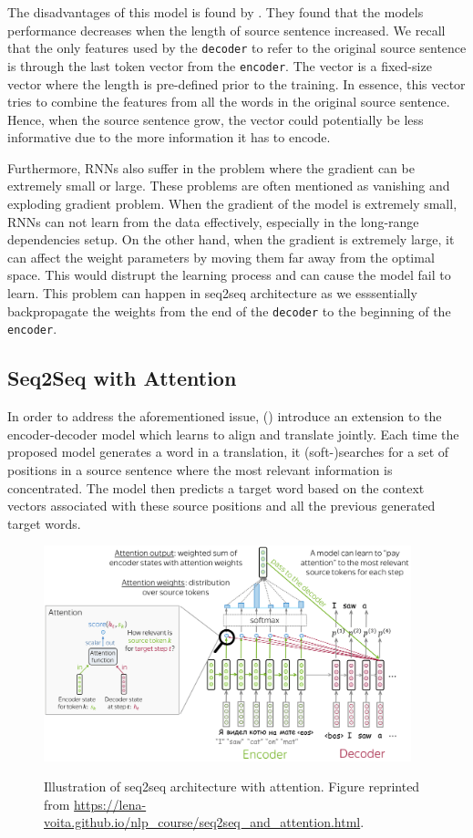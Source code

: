 The disadvantages of this model is found by \cite{cho2014properties}. They found that the models performance decreases when the length of source sentence increased. We recall that the only features used by the \texttt{decoder} to refer to the original source sentence is through the last token vector from the \texttt{encoder}. The vector is a fixed-size vector where the length is pre-defined prior to the training. In essence, this vector tries to combine the features from all the words in the original source sentence. Hence, when the source sentence grow, the vector could potentially be less informative due to the more information it has to encode.

Furthermore, RNNs also suffer in the problem where the gradient can be extremely small or large. These problems are often mentioned as vanishing and exploding gradient problem. When the gradient of the model is extremely small, RNNs can not learn from the data effectively, especially in the long-range dependencies setup. On the other hand, when the gradient is extremely large, it can affect the weight parameters by moving them far away from the optimal space. This would distrupt the learning process and can cause the model fail to learn. This problem can happen in seq2seq architecture as we esssentially backpropagate the weights from the end of the \texttt{decoder} to the beginning of the \texttt{encoder}.

\subsection{Seq2Seq with Attention}
In order to address the aforementioned issue, (\cite{bahdanau2015nmt}) introduce an extension to the encoder-decoder model which learns
to align and translate jointly. Each time the proposed model generates a word in a translation, it
(soft-)searches for a set of positions in a source sentence where the most relevant information is
concentrated. The model then predicts a target word based on the context vectors associated with
these source positions and all the previous generated target words.

\begin{figure}[h]
    {\includegraphics[width=0.95\textwidth]{img/attseq2seq.png}}
    \centering
    \caption{Illustration of seq2seq architecture with attention. Figure reprinted from \protect\url{https://lena-voita.github.io/nlp_course/seq2seq_and_attention.html}.}
    \label{img:attseq2seq}
\end{figure}

